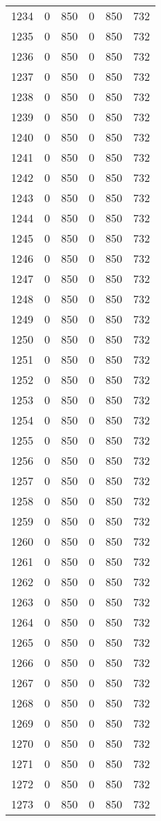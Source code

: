 \documentclass[a4paper]{ctexart}
\begin{document}
\begin{longtable}{p{1cm}|p{2cm}|p{2cm}|p{2cm}|P{2cm}|p{2cm}}
		1234&0&850&0&850&732\\
		1235&0&850&0&850&732\\
		1236&0&850&0&850&732\\
		1237&0&850&0&850&732\\
		1238&0&850&0&850&732\\
		1239&0&850&0&850&732\\
		1240&0&850&0&850&732\\
		1241&0&850&0&850&732\\
		1242&0&850&0&850&732\\
		1243&0&850&0&850&732\\
		1244&0&850&0&850&732\\
		1245&0&850&0&850&732\\
		1246&0&850&0&850&732\\
		1247&0&850&0&850&732\\
		1248&0&850&0&850&732\\
		1249&0&850&0&850&732\\
		1250&0&850&0&850&732\\
		1251&0&850&0&850&732\\
		1252&0&850&0&850&732\\
		1253&0&850&0&850&732\\
		1254&0&850&0&850&732\\
		1255&0&850&0&850&732\\
		1256&0&850&0&850&732\\
		1257&0&850&0&850&732\\
		1258&0&850&0&850&732\\
		1259&0&850&0&850&732\\
		1260&0&850&0&850&732\\
		1261&0&850&0&850&732\\
		1262&0&850&0&850&732\\
		1263&0&850&0&850&732\\
		1264&0&850&0&850&732\\
		1265&0&850&0&850&732\\
		1266&0&850&0&850&732\\
		1267&0&850&0&850&732\\
		1268&0&850&0&850&732\\
		1269&0&850&0&850&732\\
		1270&0&850&0&850&732\\
		1271&0&850&0&850&732\\
		1272&0&850&0&850&732\\
		1273&0&850&0&850&732\\

\end{longtable}
\end{document}
